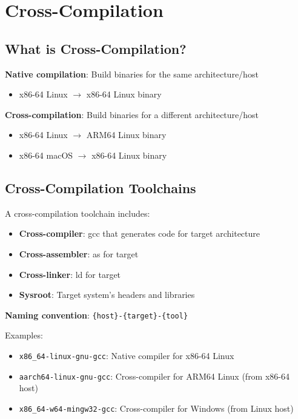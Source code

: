 \section{Cross-Compilation}

\subsection{What is Cross-Compilation?}

\textbf{Native compilation}: Build binaries for the same architecture/host
\begin{itemize}
    \item x86-64 Linux $\rightarrow$ x86-64 Linux binary
\end{itemize}

\textbf{Cross-compilation}: Build binaries for a different architecture/host
\begin{itemize}
    \item x86-64 Linux $\rightarrow$ ARM64 Linux binary
    \item x86-64 macOS $\rightarrow$ x86-64 Linux binary
\end{itemize}

\subsection{Cross-Compilation Toolchains}

A cross-compilation toolchain includes:
\begin{itemize}
    \item \textbf{Cross-compiler}: gcc that generates code for target architecture
    \item \textbf{Cross-assembler}: as for target
    \item \textbf{Cross-linker}: ld for target
    \item \textbf{Sysroot}: Target system's headers and libraries
\end{itemize}

\textbf{Naming convention}: \texttt{\{host\}-\{target\}-\{tool\}}

Examples:
\begin{itemize}
    \item \texttt{x86\_64-linux-gnu-gcc}: Native compiler for x86-64 Linux
    \item \texttt{aarch64-linux-gnu-gcc}: Cross-compiler for ARM64 Linux (from x86-64 host)
    \item \texttt{x86\_64-w64-mingw32-gcc}: Cross-compiler for Windows (from Linux host)
\end{itemize}

